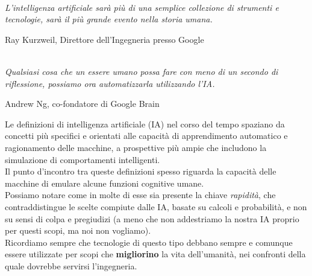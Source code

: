 \documentclass[12pt,a4paper]{report}
\begin{document}
\textit{\\L'intelligenza artificiale sarà più di una semplice collezione di strumenti e tecnologie, sarà il più grande evento nella storia umana.}
\begin{flushright}
Ray Kurzweil, Direttore dell'Ingegneria presso Google
\end{flushright}
\textit{\\Qualsiasi cosa che un essere umano possa fare con meno di un secondo di riflessione, possiamo ora automatizzarla utilizzando l'IA.}
\begin{flushright}
Andrew Ng, co-fondatore di Google Brain
\end{flushright}

Le definizioni di intelligenza artificiale (IA) nel corso del tempo spaziano da concetti più specifici e orientati alle capacità di apprendimento automatico e ragionamento delle macchine, a prospettive più ampie che includono la simulazione di comportamenti intelligenti. \\
Il punto d'incontro tra queste definizioni spesso riguarda la capacità delle macchine di emulare alcune funzioni cognitive umane. \\
Possiamo notare come in molte di esse sia presente la chiave \textit{rapidità}, che contraddistingue le scelte compiute dalle IA, basate su calcoli e probabilità, e non su sensi di colpa e pregiudizi (a meno che non addestriamo la nostra IA proprio per questi scopi, ma noi non vogliamo). \\
Ricordiamo sempre che tecnologie di questo tipo debbano sempre e comunque essere utilizzate per scopi che \textbf{migliorino} la vita dell'umanità, nei confronti della quale dovrebbe servirsi l'ingegneria.
\\
\\
\\
\\
\end{document}
